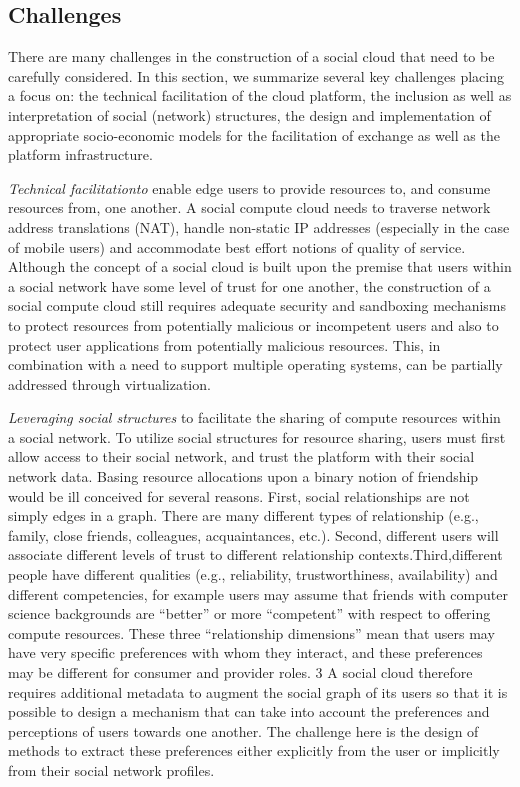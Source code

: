 \documentclass[a4paper,12pt]{article}
\begin{document}
	\subsection{Challenges}
	There are many challenges in the construction of a social cloud that need to be carefully considered. In this section, we summarize several key challenges placing a focus on: the technical facilitation of the cloud platform, the inclusion as well as interpretation of social (network) structures, the design and implementation of appropriate socio-economic models for the facilitation of exchange as well as the platform infrastructure.
	\par \textit{Technical facilitationto} enable edge users to provide resources to, and consume resources from, one another. A social compute cloud needs to traverse network address translations (NAT), handle non-static IP addresses (especially in the case of mobile users) and accommodate best effort notions of quality of service. Although the concept of a social cloud is built upon the premise that users within a social network have some level of trust for one another, the construction of a social compute cloud still requires adequate security and sandboxing mechanisms to protect resources from potentially malicious or incompetent users and also to protect user applications from potentially malicious resources. This, in combination with a need to support multiple operating systems, can be partially addressed through virtualization.
 	\par\textit{ Leveraging social structures} to facilitate the sharing of compute resources within a social network. To utilize social structures for resource sharing, users must first allow access to their social network, and trust the platform with their social network data. Basing resource allocations upon a binary notion of friendship would be ill conceived for several reasons. First, social relationships are not simply edges in a graph. There are many different types of relationship (e.g., family, close friends, colleagues, acquaintances, etc.). Second, different users will associate different levels of trust to different relationship contexts.Third,different people have different qualities (e.g., reliability, trustworthiness, availability) and different competencies, for example users may assume that friends with computer science backgrounds are “better” or more “competent” with respect to offering compute resources. These three “relationship dimensions” mean that users may have very specific preferences with whom they interact, and these preferences may be different for consumer and provider roles. 3 A social cloud therefore requires additional metadata to augment the social graph of its users so that it is possible to design a mechanism that can take into account the preferences and perceptions of users towards one another. The challenge here is the design of methods to extract these preferences either explicitly from the user or implicitly from their social network profiles.
\end{document}

